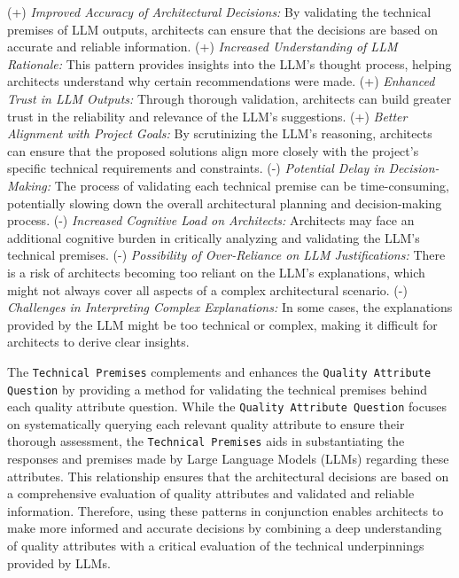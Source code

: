 \newline
\textcolor{mycolorblue}{(+)} \textit{Improved Accuracy of Architectural Decisions:} By validating the technical premises of LLM outputs, architects can ensure that the decisions are based on accurate and reliable information. \newline
\textcolor{mycolorblue}{(+)} \textit{Increased Understanding of LLM Rationale:} This pattern provides insights into the LLM's thought process, helping architects understand why certain recommendations were made. \newline
\textcolor{mycolorblue}{(+)} \textit{Enhanced Trust in LLM Outputs:} Through thorough validation, architects can build greater trust in the reliability and relevance of the LLM's suggestions. \newline
\textcolor{mycolorblue}{(+)} \textit{Better Alignment with Project Goals:} By scrutinizing the LLM's reasoning, architects can ensure that the proposed solutions align more closely with the project's specific technical requirements and constraints. \newline
\textcolor{mycolorred}{(-)} \textit{Potential Delay in Decision-Making:} The process of validating each technical premise can be time-consuming, potentially slowing down the overall architectural planning and decision-making process. \newline
\textcolor{mycolorred}{(-)} \textit{Increased Cognitive Load on Architects:} Architects may face an additional cognitive burden in critically analyzing and validating the LLM's technical premises.\newline
\textcolor{mycolorred}{(-)} \textit{Possibility of Over-Reliance on LLM Justifications:} There is a risk of architects becoming too reliant on the LLM’s explanations, which might not always cover all aspects of a complex architectural scenario. \newline
\textcolor{mycolorred}{(-)} \textit{Challenges in Interpreting Complex Explanations:} In some cases, the explanations provided by the LLM might be too technical or complex, making it difficult for architects to derive clear insights. \newline

  The \texttt{Technical Premises} complements and enhances the \texttt{Quality Attribute Question} by providing a method for validating the technical premises behind each quality attribute question. While the \texttt{Quality Attribute Question} focuses on systematically querying each relevant quality attribute to ensure their thorough assessment, the \texttt{Technical Premises} aids in substantiating the responses and premises made by Large Language Models (LLMs) regarding these attributes. This relationship ensures that the architectural decisions are based on a comprehensive evaluation of quality attributes and validated and reliable information. Therefore, using these patterns in conjunction enables architects to make more informed and accurate decisions by combining a deep understanding of quality attributes with a critical evaluation of the technical underpinnings provided by LLMs.

